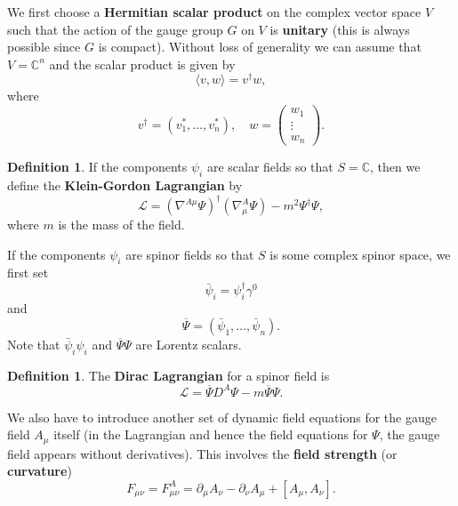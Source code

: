\documentclass[11pt]{amsart}
\theoremstyle{definition}
\newtheorem{defn}[thm]{Definition}
\theoremstyle{remark}
\numberwithin{equation}{section}
\begin{document}
We first choose a {\bf Hermitian scalar product} on the complex vector space $V$ such that the action of the gauge group $G$ on $V$ is {\bf unitary} (this is always possible since $G$ is compact). Without loss of generality we can assume that $V=\mathbb{C}^n$ and the scalar product is given by
\begin{equation*}
\langle v,w\rangle=v^\dagger w,
\end{equation*}
where
\begin{equation*}
v^\dagger=(v_1^*,\ldots,v_n^*),\quad w=\left(\begin{array}{c}w_1\\ \vdots \\ w_n \end{array}\right).
\end{equation*}
\begin{defn}\label{defn Klein Gordon Lag}
If the components $\psi_i$ are scalar fields so that $S=\mathbb{C}$, then we define the {\bf Klein-Gordon Lagrangian} by
\begin{equation*}
\mathcal{L}=(\nabla^{A\mu}\Psi)^\dagger(\nabla^A_\mu\Psi)-m^2\Psi^\dagger\Psi,
\end{equation*}
where $m$ is the mass of the field.
\end{defn}
If the components $\psi_i$ are spinor fields so that $S$ is some complex spinor space, we first set
\begin{equation*}
\bar{\psi}_i=\psi_i^\dagger\gamma^0
\end{equation*}
and
\begin{equation*}
\overline{\Psi}=(\bar{\psi}_1,\ldots,\bar{\psi}_n).
\end{equation*}
Note that $\bar{\psi}_i\psi_i$ and $\overline{\Psi}\Psi$ are Lorentz scalars. 
\begin{defn}\label{defn Dirac Lag}
The {\bf Dirac Lagrangian} for a spinor field is
\begin{equation*}
\mathcal{L}=\overline{\Psi}D^A\Psi-m\overline{\Psi}{\Psi}.
\end{equation*}
\end{defn}
We also have to introduce another set of dynamic field equations for the gauge field $A_\mu$ itself (in the Lagrangian and hence the field equations for $\Psi$, the gauge field appears without derivatives). This involves the {\bf field strength} (or {\bf curvature})
\begin{equation*}
F_{\mu\nu}=F^A_{\mu\nu}=\partial_\mu A_\nu-\partial_\nu A_\mu+[A_\mu,A_\nu].
\end{equation*} 
\end{document}
